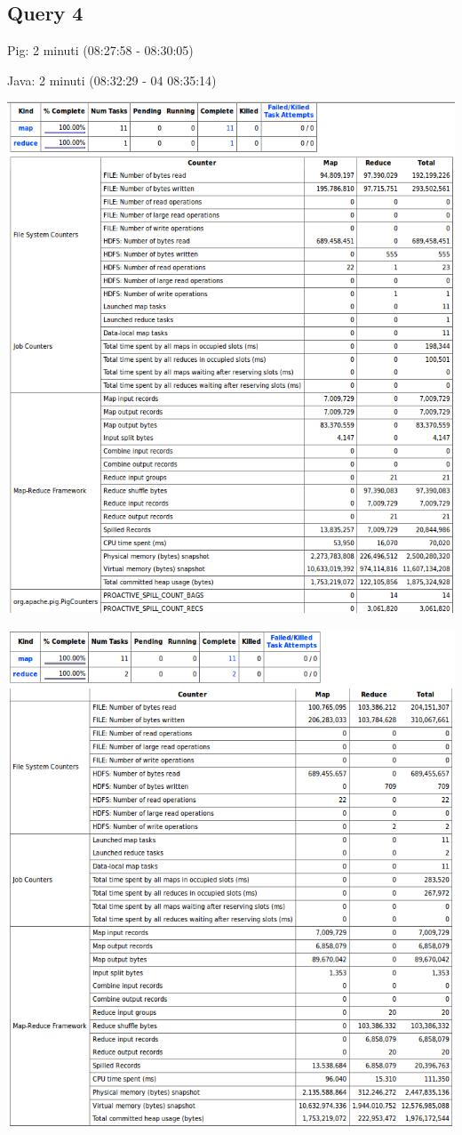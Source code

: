 \documentclass[11pt]{article} %
\begin{document}
\subsection{Query 4}
Pig: 2 minuti	 (08:27:58 - 08:30:05)

Java: 2 minuti	 (08:32:29 - 04 08:35:14)

\includegraphics[scale=0.8]{pig4.png}

\includegraphics[scale=0.8]{java4.png}
\end{document}
